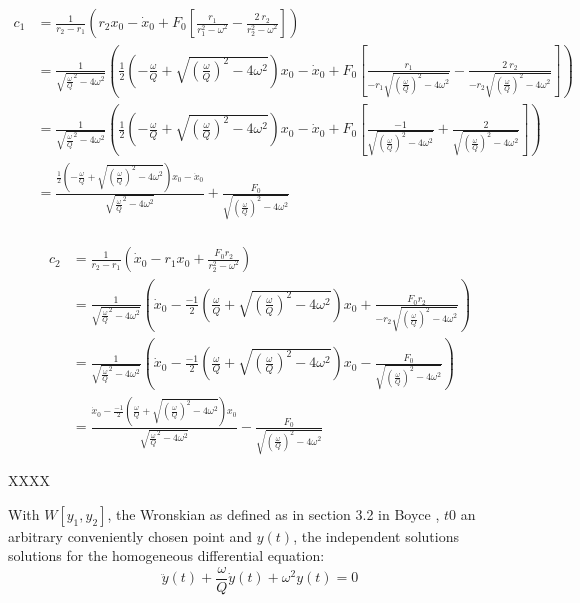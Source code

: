 \begin{align*}
	c_1 &= \frac{1}{r_2 - r_1} \left( r_2 x_0 -\dot{x}_0 + F_0 \left[ \frac{r_1}{r_1^2 - \omega^2} -  \frac{2 \: r_2}{r_2^2 - \omega^2} \right] \right) \\
	&= \frac{1}{\sqrt{\frac{\omega}{Q}^2 - 4 \omega^2}} \left( \frac{1}{2} \left( -\frac{\omega}{Q} + \sqrt{\left( \frac{\omega}{Q} \right)^2 -4 \omega^2} \right) x_0 -\dot{x}_0 + F_0 \left[ \frac{r_1}{- r_1 \sqrt{\left( \frac{\omega}{Q} \right)^2 -4 \omega^2}} -  \frac{2 \: r_2}{- r_2 \sqrt{\left( \frac{\omega}{Q} \right)^2 -4 \omega^2}} \right] \right) \\
	&=  \frac{1}{\sqrt{\frac{\omega}{Q}^2 - 4 \omega^2}} \left( \frac{1}{2} \left( -\frac{\omega}{Q} + \sqrt{\left( \frac{\omega}{Q} \right)^2 -4 \omega^2} \right) x_0 -\dot{x}_0 + F_0 \left[ \frac{-1}{\sqrt{\left( \frac{\omega}{Q} \right)^2 -4 \omega^2}} +  \frac{2}{\sqrt{\left( \frac{\omega}{Q} \right)^2 -4 \omega^2}} \right] \right) \\ 
	&=  \frac{\frac{1}{2} \left( -\frac{\omega}{Q} + \sqrt{\left( \frac{\omega}{Q} \right)^2 -4 \omega^2} \right) x_0 -\dot{x}_0}{\sqrt{\frac{\omega}{Q}^2 - 4 \omega^2}}   +  \frac{F_0}{\sqrt{\left( \frac{\omega}{Q} \right)^2 -4 \omega^2}} \\ 
\end{align*}

\begin{align*}
	c_2 &= \frac{1}{r_2 - r_1} \left( \dot{x}_0 - r_1 x_0 +  \frac{F_0 r_2}{r_2^2 - \omega^2} \right) \\
	&= \frac{1}{\sqrt{\frac{\omega}{Q}^2 - 4 \omega^2}} \left( \dot{x}_0 - \frac{-1}{2} \left( \frac{\omega}{Q} + \sqrt{\left( \frac{\omega}{Q} \right)^2 -4 \omega^2} \right) x_0 +  \frac{F_0 r_2}{- r_2 \sqrt{\left( \frac{\omega}{Q} \right)^2 -4 \omega^2}} \right) \\
	&= \frac{1}{\sqrt{\frac{\omega}{Q}^2 - 4 \omega^2}} \left( \dot{x}_0 - \frac{-1}{2} \left( \frac{\omega}{Q} + \sqrt{\left( \frac{\omega}{Q} \right)^2 -4 \omega^2} \right) x_0 -  \frac{F_0}{\sqrt{\left( \frac{\omega}{Q} \right)^2 -4 \omega^2}} \right) \\
	&= \frac{ \dot{x}_0 - \frac{-1}{2} \left( \frac{\omega}{Q} + \sqrt{\left( \frac{\omega}{Q} \right)^2 -4 \omega^2} \right) x_0 }{\sqrt{\frac{\omega}{Q}^2 - 4 \omega^2}} -  \frac{F_0}{\sqrt{\left( \frac{\omega}{Q} \right)^2 -4 \omega^2}} 
\end{align*}


XXXX

With $W[y_1,y_2]$, the Wronskian as defined as in section 3.2 in Boyce \cite{boyce}, $t0$ an arbitrary conveniently chosen point  and $y(t)$, the independent solutions solutions for the homogeneous differential equation:
\begin{equation}
	\label{eq_diff_homo}
	\ddot{y}(t) + \frac{\omega}{Q} \dot{y}(t) + \omega^2 y(t) = 0
\end{equation}

